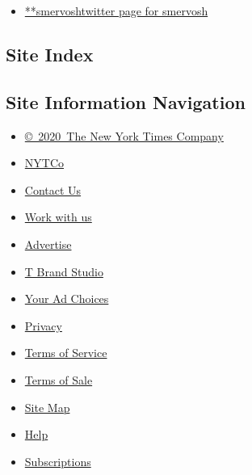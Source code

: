 \begin{itemize}
\tightlist
\item
  \href{https://twitter.com/smervosh}{**smervoshtwitter page for
  smervosh}
\end{itemize}

\hypertarget{site-index}{%
\subsection{Site Index}\label{site-index}}

\hypertarget{site-information-navigation}{%
\subsection{Site Information
Navigation}\label{site-information-navigation}}

\begin{itemize}
\tightlist
\item
  \href{https://help.nytimes.com/hc/en-us/articles/115014792127-Copyright-notice}{©~2020~The
  New York Times Company}
\end{itemize}

\begin{itemize}
\tightlist
\item
  \href{https://www.nytco.com/}{NYTCo}
\item
  \href{https://help.nytimes.com/hc/en-us/articles/115015385887-Contact-Us}{Contact
  Us}
\item
  \href{https://www.nytco.com/careers/}{Work with us}
\item
  \href{https://nytmediakit.com/}{Advertise}
\item
  \href{http://www.tbrandstudio.com/}{T Brand Studio}
\item
  \href{https://www.nytimes.com/privacy/cookie-policy\#how-do-i-manage-trackers}{Your
  Ad Choices}
\item
  \href{https://www.nytimes.com/privacy}{Privacy}
\item
  \href{https://help.nytimes.com/hc/en-us/articles/115014893428-Terms-of-service}{Terms
  of Service}
\item
  \href{https://help.nytimes.com/hc/en-us/articles/115014893968-Terms-of-sale}{Terms
  of Sale}
\item
  \href{https://spiderbites.nytimes.com}{Site Map}
\item
  \href{https://help.nytimes.com/hc/en-us}{Help}
\item
  \href{https://www.nytimes.com/subscription?campaignId=37WXW}{Subscriptions}
\end{itemize}
